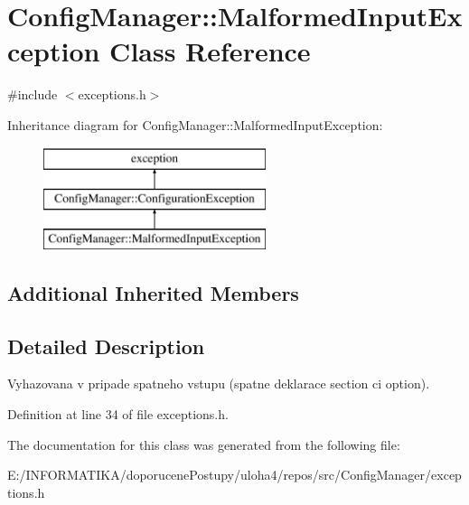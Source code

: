 \hypertarget{class_config_manager_1_1_malformed_input_exception}{}\section{Config\+Manager\+:\+:Malformed\+Input\+Exception Class Reference}
\label{class_config_manager_1_1_malformed_input_exception}


{\ttfamily \#include $<$exceptions.\+h$>$}

Inheritance diagram for Config\+Manager\+:\+:Malformed\+Input\+Exception\+:\begin{figure}[H]
\begin{center}
\leavevmode
\includegraphics[height=3.000000cm]{class_config_manager_1_1_malformed_input_exception}
\end{center}
\end{figure}
\subsection*{Additional Inherited Members}


\subsection{Detailed Description}
Vyhazovana v pripade spatneho vstupu (spatne deklarace section ci option). 

Definition at line 34 of file exceptions.\+h.



The documentation for this class was generated from the following file\+:\begin{DoxyCompactItemize}
\item 
E\+:/\+I\+N\+F\+O\+R\+M\+A\+T\+I\+K\+A/doporucene\+Postupy/uloha4/repos/src/\+Config\+Manager/exceptions.\+h\end{DoxyCompactItemize}
